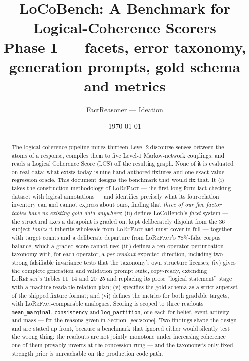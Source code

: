 \documentclass[11pt]{article}
\title{LoCoBench: A Benchmark for Logical-Coherence Scorers\\
       \large Phase 1 --- facets, error taxonomy, generation prompts,
       gold schema and metrics}
\author{FactReasoner --- Ideation}
\date{\today}
\newcommand{\readout}[1]{\texttt{#1}}
\begin{document}
\maketitle

\begin{abstract}\noindent
The logical-coherence pipeline mines thirteen Level-2 discourse senses between the atoms of
a response, compiles them to five Level-1 Markov-network couplings, and reads a Logical
Coherence Score (LCS) off the resulting graph. None of it is evaluated on real data: what
exists today is nine hand-authored fixtures and one exact-value regression oracle. This
document designs the benchmark that would fix that. It (i) takes the construction
methodology of \textsc{LoReFact} \citep{lorefact} --- the first long-form fact-checking
dataset with logical annotations --- and identifies precisely what its four-relation
inventory can and cannot express about ours, finding that \emph{three of our five factor
tables have no existing gold data anywhere}; (ii) defines LoCoBench's \emph{facet} system --- the
structural axes a datapoint is graded on, kept deliberately disjoint from the 36 subject
\emph{topics} it inherits wholesale from \textsc{LoReFact} and must cover in full --- together
with target counts and a deliberate departure from \textsc{LoReFact}'s 78\%-false corpus balance,
which a graded score cannot use; (iii) defines a ten-operator perturbation taxonomy with, for each operator,
a \emph{per-readout} expected direction, including two strong falsifiable invariance tests
that the taxonomy's own structure licenses; (iv) gives the complete generation and validation
prompt suite, copy-ready, extending \textsc{LoReFact}'s Tables 11--14 and 20--25 and replacing
its prose ``logical statement'' stage with a machine-readable relation plan; (v) specifies the
gold schema as a strict superset of the shipped fixture format; and (vi) defines the metrics
for both gradable targets, with \textsc{LoReFact}-comparable analogues. Scoring is scoped to
three readouts --- \readout{mean\_marginal}, \readout{consistency} and \readout{log\_partition},
one each for belief, event activity and mass --- for the reasons given in
Section~\ref{sec:scope}. Two findings shape the
design and are stated up front, because a benchmark that ignored either would silently test
the wrong thing: the readouts are not jointly monotone under increasing coherence --- one of
them provably inverts at the concession rung --- and the taxonomy's only fixed strength prior
is unreachable on the production code path.
\end{abstract}
\end{document}
